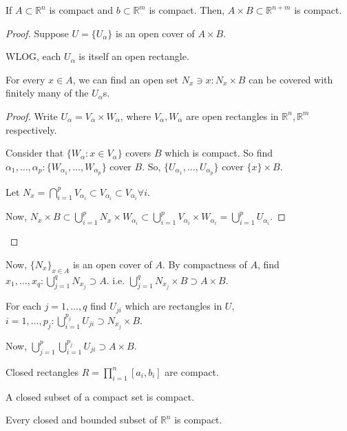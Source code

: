 \documentclass[a4paper]{article}
\numberwithin{equation}{section}
\newcommand{\R}{\mathbb{R}}
\begin{document}
\begin{theorem}[]
    If $A\subset\R^n$ is compact and $b\subset\R^m$ is compact. Then, $A\times B\subset\R^{n+m}$ is compact.
    \begin{proof}
        Suppose $U=\{U_{\alpha}\}$ is an open cover of $A\times B$.

        \vspace{10pt}
        WLOG, each $U_\alpha$ is itself an open rectangle.
        \vspace{10pt}
                
        \begin{lemma}
            For every $x\in A$, we can find an open set $N_x\ni x: N_x\times B$ can be covered with finitely many of the $U_\alpha$s.
            \vspace{10pt}
            
            \begin{proof}
                Write $U_\alpha=V_\alpha\times W_\alpha$, where $V_\alpha,W_\alpha$ are open rectangles in $\R^n,\R^m$ respectively.
                
                Consider that $\{W_\alpha:x\in V_\alpha\}$ covers $B$ which is compact. So find $\alpha_1,\dots,\alpha_p: \{W_{\alpha_1},\dots,W_{\alpha_p}\}$ cover $B$. So, $\{U_{\alpha_1},\dots,U_{\alpha_p}\}$ cover $\{x\}\times B$.
                \vspace{10pt}
                
                Let $N_x=\bigcap_{i=1}^pV_{\alpha_i}\subset V_{\alpha_i}\subset V_{\alpha_i}\forall i$.
                \vspace{10pt}

                Now, $N_x\times B\subset\bigcup_{i=1}^pN_x\times W_{\alpha_i}\subset\bigcup_{i=1}^pV_{\alpha_i}\times W_{\alpha_i}=\bigcup_{i=1}^pU_{\alpha_i}$.
            \end{proof} 

        \end{lemma}
    \end{proof}
    Now, $\{N_x\}_{x\in A}$ is an open cover of $A$. By compactness of $A$, find $x_1,\dots,x_q:\bigcup_{j=1}^qN_{x_j}\supset A$. i.e. $\bigcup_{j=1}^qN_{x_j}\times B\supset A\times B$.

    For each $j=1,\dots,q$ find $U_{ji}$ which are rectangles in $U$, $i=1,\dots,p_j:\bigcup_{i=1}^{p_j}U_{ji}\supset N_{x_j}\times B$. 
    
    Now, $\bigcup_{j=1}^p\bigcup_{i=1}^{p_j}U_{ji}\supset A\times B$.
\end{theorem}
\begin{corollary}
    Closed rectangles $R=\prod_{i=1}^n[a_i,b_i]$ are compact.
\end{corollary}
\begin{proposition}
    A closed subset of a compact set is compact. 
\end{proposition}
\begin{corollary}
    Every closed and bounded subset of $\R^n$ is compact.
\end{corollary}
\end{document}
